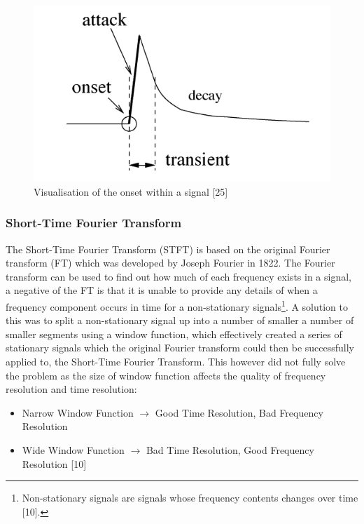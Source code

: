 \documentclass[a4paper, 11pt]{article}
\begin{document}
\begin{figure}[h]
\caption{Visualisation of the onset within a signal [25]}
	\centering
	\includegraphics[scale=0.40]{Onset}
\end{figure}

\subsubsection{Short-Time Fourier Transform}
The Short-Time Fourier Transform (STFT) is based on the original Fourier transform (FT) which was developed by Joseph Fourier in 1822. The Fourier transform can be used to find out how much of each frequency exists in a signal, a negative of the FT is that it is unable to provide any details of when a frequency component occurs in time for a non-stationary signals\footnote{Non-stationary signals are signals whose frequency contents changes over time [10].}. A solution to this was to split a non-stationary signal up into a number of smaller a number of smaller segments using a window function, which effectively created a series of stationary signals which the original Fourier transform could then be successfully applied to, the Short-Time Fourier Transform. This however did not fully solve the problem as the size of window function affects the quality of frequency resolution and time resolution:
\begin{itemize}
\item Narrow Window Function $\longrightarrow$  Good Time Resolution, Bad Frequency Resolution
\item Wide Window Function $\longrightarrow$  Bad Time Resolution, Good Frequency Resolution [10]
\end{itemize}
\end{document}
